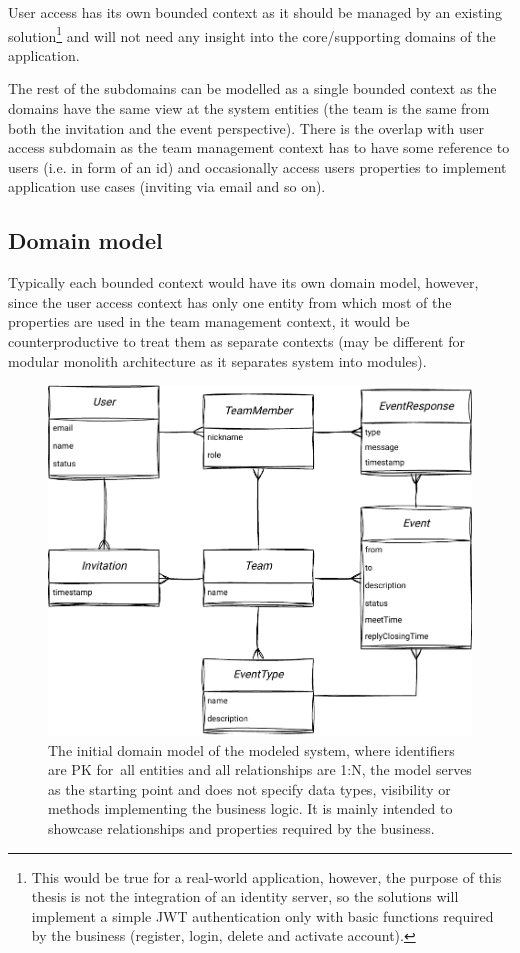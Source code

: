 User access has its own bounded context as it should be managed by an existing solution\footnote{This would be true for a real-world application, however, the purpose of this thesis is not the integration of an identity server, so the solutions will implement a simple JWT authentication only with basic functions required by the business (register, login, delete and activate account).} and will not need any insight into the core/supporting domains of the application.

The rest of the subdomains can be modelled as a single bounded context as the domains have the same view at the system entities (the team is the same from both the invitation and the event perspective). There is the overlap with user access subdomain as the team management context has to have some reference to users (i.e. in form of an id) and occasionally access users properties to implement application use cases (inviting via email and so on).

\subsection{Domain model}
Typically each bounded context would have its own domain model, however, since the user access context has only one entity from which most of the properties are used in the team management context, it would be counterproductive to treat them as separate contexts (may be different for modular monolith architecture as it separates system into modules).
\begin{figure} [H]
    \centering
    \includegraphics[width=1\textwidth]{figures/domain-0.pdf}
    \caption{The initial domain model of the modeled system, where identifiers are PK for~all entities and all relationships are 1:N, the model serves as the starting point and does not specify data types, visibility or methods implementing the business logic. It is mainly intended to showcase relationships and properties required by the business.}
    \label{fig:dev_domains}
\end{figure}

